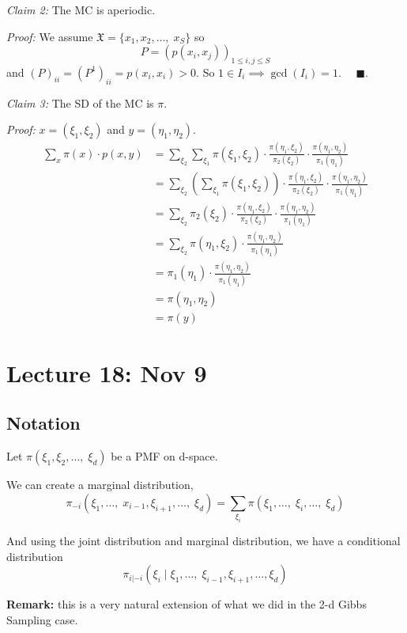 \documentclass[12pt]{article}
\newcommand{\qed}{\quad \blacksquare}
\newcommand{\mfX}{\mathfrak{X}}
\begin{document}
        \emph{Claim 2:} The MC is aperiodic. 

        \emph{Proof:} We assume $\mfX = \{x_1, x_2, \dots,\; x_S\}$ so 
        \[P = (p(x_i, x_j))_{1 \leq i, j \leq S}\]
        and $(P)_{ii} = (P^1)_{ii} = p(x_i, x_i) > 0$. So $1 \in I_i \implies \gcd(I_i) = 1$. $\qed$. 

        \emph{Claim 3:} The SD of the MC is $\pi$. 

        \emph{Proof:} $x = (\xi_1, \xi_2)$ and $y = (\eta_1, \eta_2)$. 
        \begin{align*}
            \sum_x \pi(x) \cdot p(x, y) &= \sum_{\xi_2} \sum_{\xi_1} \pi(\xi_1, \xi_2) \cdot \frac{\pi(\eta_1, \xi_2)}{\pi_2(\xi_2)} \cdot \frac{\pi(\eta_1, \eta_2)}{\pi_1(\eta_1)}\\
            &= \sum_{\xi_2} \left(\sum_{\xi_1} \pi(\xi_1, \xi_2)\right) \cdot \frac{\pi(\eta_1, \xi_2)}{\pi_2(\xi_2)} \cdot \frac{\pi(\eta_1, \eta_2)}{\pi_1(\eta_1)}\\
            &= \sum_{\xi_2} \pi_2(\xi_2) \cdot \frac{\pi(\eta_1, \xi_2)}{\pi_2(\xi_2)} \cdot \frac{\pi(\eta_1, \eta_2)}{\pi_1(\eta_1)}\\
            &= \sum_{\xi_2} \pi(\eta_1, \xi_2)\cdot \frac{\pi(\eta_1, \eta_2)}{\pi_1(\eta_1)}\\
            &= \pi_1(\eta_1) \cdot \frac{\pi(\eta_1, \eta_2)}{\pi_1(\eta_1)}\\
            &= \pi(\eta_1, \eta_2)\\
            &= \pi(y)
        \end{align*}

\section{Lecture 18: Nov 9}
    \subsection{Notation}
        Let $\pi(\xi_1, \xi_2, \dots,\; \xi_d)$ be a PMF on d-space. 

        We can create a marginal distribution, 
        \[\pi_{-i}(\xi_1, \dots, \; x_{i-1}, \xi_{i+1}, \dots,\; \xi_d) = \sum_{\xi_i} \pi(\xi_1, \dots,\; \xi_i, \dots,\; \xi_d)\]

        And using the joint distribution and marginal distribution, we have a conditional distribution 
        \[\pi_{i|-i}(\xi_i \; | \; \xi_1, \dots,\; \xi_{i-1}, \xi_{i+1}, \dots,\xi_d)\]

        \textbf{Remark:} this is a very natural extension of what we did in the 2-d Gibbs Sampling case. 
\end{document}
